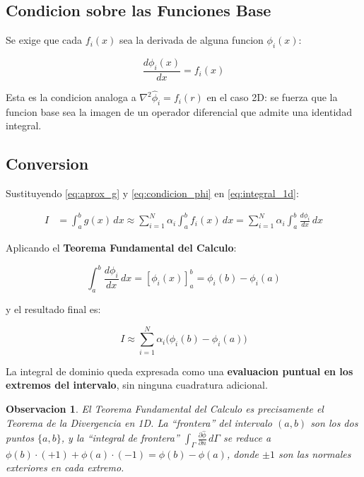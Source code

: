 \documentclass[12pt,a4paper]{article}
\newtheorem{remark}{Observacion}
\begin{document}
\subsection{Condicion sobre las Funciones Base}

Se exige que cada $f_i(x)$ sea la derivada de alguna funcion $\phi_i(x)$:

\begin{equation}
    \frac{d\phi_i(x)}{dx} = f_i(x)
    \label{eq:condicion_phi}
\end{equation}

Esta es la condicion analoga a $\nabla^2\hat{\phi}_i = f_i(r)$ en el caso 2D:
se fuerza que la funcion base sea la imagen de un operador diferencial que
admite una identidad integral.

\subsection{Conversion}

Sustituyendo \eqref{eq:aprox_g} y \eqref{eq:condicion_phi} en
\eqref{eq:integral_1d}:

\begin{align}
    I &= \int_a^b g(x)\,dx
     \approx \sum_{i=1}^{N} \alpha_i \int_a^b f_i(x)\,dx
     = \sum_{i=1}^{N} \alpha_i \int_a^b \frac{d\phi_i}{dx}\,dx
\end{align}

Aplicando el \textbf{Teorema Fundamental del Calculo}:

\begin{equation}
    \int_a^b \frac{d\phi_i}{dx}\,dx = \left[\phi_i(x)\right]_a^b
    = \phi_i(b) - \phi_i(a)
\end{equation}

y el resultado final es:

\begin{equation}
\boxed{
    I \approx \sum_{i=1}^{N} \alpha_i \bigl(\phi_i(b) - \phi_i(a)\bigr)
}
\label{eq:resultado_1d}
\end{equation}

La integral de dominio queda expresada como una \textbf{evaluacion puntual
en los extremos del intervalo}, sin ninguna cuadratura adicional.

\begin{remark}
El Teorema Fundamental del Calculo es precisamente el Teorema de la
Divergencia en 1D. La ``frontera'' del intervalo $(a,b)$ son los dos
puntos $\{a, b\}$, y la ``integral de frontera''
$\int_\Gamma \frac{\partial\hat\phi}{\partial n}\,d\Gamma$ se reduce a
$\phi(b)\cdot(+1) + \phi(a)\cdot(-1) = \phi(b) - \phi(a)$,
donde $\pm 1$ son las normales exteriores en cada extremo.
\end{remark}
\end{document}
